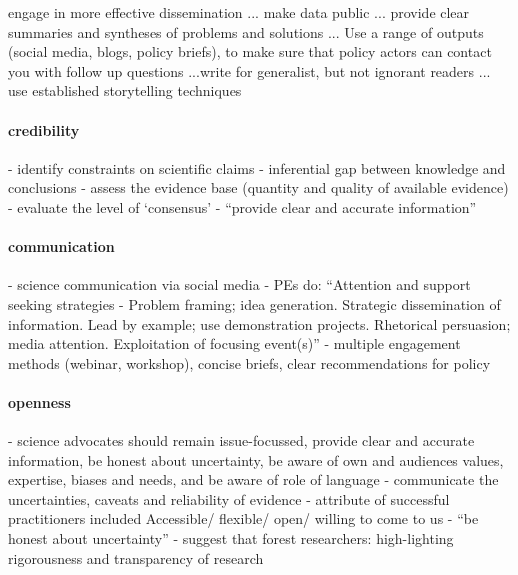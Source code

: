 engage in more effective dissemination ... make data public ... provide clear summaries and syntheses of problems and solutions ... Use a range of outputs (social media, blogs, policy briefs), to make sure that policy actors can contact you with follow up questions ...write for generalist, but not ignorant readers ... use established storytelling techniques
\paragraph{credibility}
\cite{GluckmanBK2021} - identify constraints on scientific claims - inferential gap between knowledge and conclusions
\cite{GluckmanBK2021} - assess the evidence base (quantity and quality of available evidence)
\cite{GluckmanBK2021} - evaluate the level of `consensus'
\cite{ElsensohnACDGGKPRS2019} - ``provide clear and accurate information''
\paragraph{communication}
\cite{LubchencoR2020} - science communication via social media 
\cite{vonMalmborg2024strategies} - PEs do: ``Attention and support seeking strategies - Problem framing; idea generation. Strategic dissemination of information. Lead by example; use demonstration projects. Rhetorical persuasion; media attention. Exploitation of focusing event(s)''
\cite{ThompsonD2024} - multiple engagement methods (webinar, workshop), concise briefs, clear recommendations for policy
\paragraph{openness}
\cite{ElsensohnACDGGKPRS2019} - science advocates should remain issue-focussed, provide clear and accurate information, be honest about uncertainty, be aware of own and audiences values, expertise, biases and needs, and be aware of role of language
\cite{GluckmanBK2021} - communicate the uncertainties, caveats and reliability of evidence
\cite{GogginEtAl2015} - attribute of successful practitioners included Accessible/ flexible/ open/ willing to come to us
\cite{ElsensohnACDGGKPRS2019} - ``be honest about uncertainty''
\cite{OjanenBKP2021} - suggest that forest researchers: high-lighting rigorousness and transparency of research
